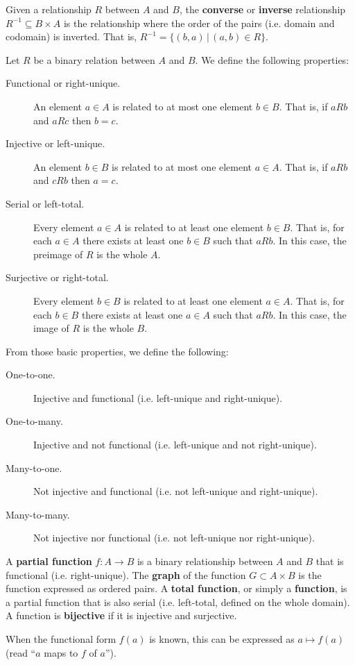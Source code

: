 \documentclass{bareminimum}
\begin{document}
\begin{defn}
	Given a relationship   $R$ between $A$ and $B$, the \textbf{converse} or \textbf{inverse} relationship $R^{-1} \subseteq B \times A$ is the relationship where the order of the pairs (i.e. domain and codomain) is inverted. That is, $R^{-1} = \{ (b, a) \, | \, (a, b) \in R\}$.
\end{defn}

\begin{defn}
	Let $R$  be a binary relation between $A$ and $B$. We define the following properties:
	\begin{description}
		\item[Functional or right-unique.] An element $a \in A$ is related to at most one element $b \in B$. That is, if $aRb$ and $aRc$ then $b = c$.
		\item[Injective or left-unique.] An element $b \in B$ is related to at most one element $a \in A$. That is, if $aRb$ and $cRb$ then $a = c$.
		\item[Serial or left-total.] Every element $a \in A$ is related to at least one element $b \in B$. That is, for each $a \in A$ there exists at least one $b \in B$ such that $aRb$. In this case, the preimage of $R$ is the whole $A$.
		\item[Surjective or right-total.] Every element $b \in B$ is related to at least one element $a \in A$. That is, for each $b \in B$ there exists at least one $a \in A$ such that $aRb$. In this case, the image of $R$ is the whole $B$.
	\end{description}
	From those basic properties, we define the following:
	\begin{description}
		\item[One-to-one.] Injective and functional (i.e. left-unique and right-unique).
		\item[One-to-many.] Injective and not functional (i.e. left-unique and not right-unique).
		\item[Many-to-one.] Not injective and functional (i.e. not left-unique and right-unique).
		\item[Many-to-many.] Not injective nor functional (i.e. not left-unique nor right-unique).
	\end{description}	
\end{defn}

\begin{defn}[Function]
	A \textbf{partial function}  $f : A \to B$ is a binary relationship between $A$ and $B$ that is functional (i.e. right-unique). The \textbf{graph} of the function $G \subset A \times B$ is the function expressed as ordered pairs. A \textbf{total function}, or simply a \textbf{function}, is a partial function that is also serial (i.e. left-total, defined on the whole domain). A function is \textbf{bijective} if it is injective and surjective.
	
	When the functional form $f(a)$ is known, this can be expressed as $a \mapsto f(a)$ (read ``$a$ maps to $f$ of $a$'').
\end{defn}
\end{document}
